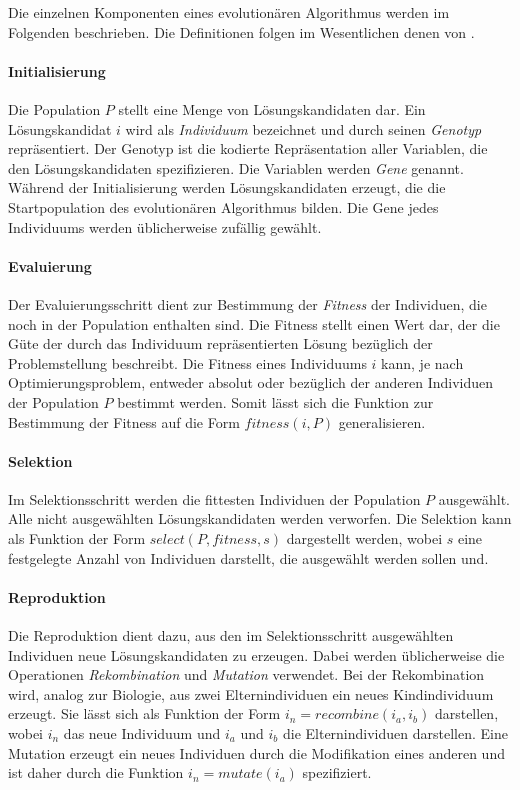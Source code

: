 Die einzelnen Komponenten eines evolutionären Algorithmus werden im Folgenden beschrieben. Die Definitionen folgen im Wesentlichen denen von \textcite{tw2008}.

\paragraph{Initialisierung}

Die Population \(P\) stellt eine Menge von Lösungskandidaten dar. Ein Lösungskandidat \(i\) wird als \emph{Individuum} bezeichnet und durch seinen \emph{Genotyp} repräsentiert. Der Genotyp ist die kodierte Repräsentation aller Variablen, die den Lösungskandidaten spezifizieren. Die Variablen werden \emph{Gene} genannt. Während der Initialisierung werden Lösungskandidaten erzeugt, die die Startpopulation des evolutionären Algorithmus bilden. Die Gene jedes Individuums werden üblicherweise zufällig gewählt.

\paragraph{Evaluierung}

Der Evaluierungsschritt dient zur Bestimmung der \emph{Fitness} der Individuen, die noch in der Population enthalten sind. Die Fitness stellt einen Wert dar, der die Güte der durch das Individuum repräsentierten Lösung bezüglich der Problemstellung beschreibt. Die Fitness eines Individuums \(i\) kann, je nach Optimierungsproblem, entweder absolut oder bezüglich der anderen Individuen der Population \(P\) bestimmt werden. Somit lässt sich die Funktion zur Bestimmung der Fitness auf die Form \(fitness(i, P)\) generalisieren.

\paragraph{Selektion}

Im Selektionsschritt werden die fittesten Individuen der Population \(P\) ausgewählt. Alle nicht ausgewählten Lösungskandidaten werden verworfen. Die Selektion kann als Funktion der Form \(select(P, fitness, s)\) dargestellt werden, wobei \(s\) eine festgelegte Anzahl von Individuen darstellt, die ausgewählt werden sollen und.

\paragraph{Reproduktion}

Die Reproduktion dient dazu, aus den im Selektionsschritt ausgewählten Individuen neue Lösungskandidaten zu erzeugen. Dabei werden üblicherweise die Operationen \emph{Rekombination} und \emph{Mutation} verwendet. Bei der Rekombination wird, analog zur Biologie, aus zwei Elternindividuen ein neues Kindindividuum erzeugt. Sie lässt sich als Funktion der Form \(i_n = recombine(i_a, i_b)\) darstellen, wobei \(i_n\) das neue Individuum und \(i_a\) und \(i_b\) die Elternindividuen darstellen. Eine Mutation erzeugt ein neues Individuen durch die Modifikation eines anderen und ist daher durch die Funktion \(i_n = mutate(i_a)\) spezifiziert.

